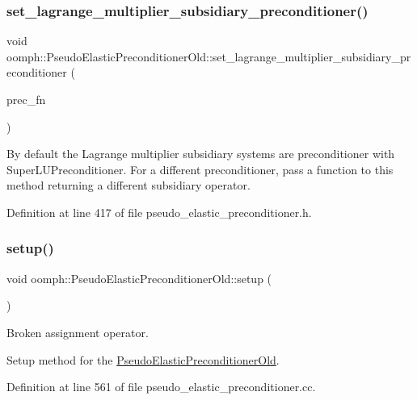 \subsubsection{\texorpdfstring{set\+\_\+lagrange\+\_\+multiplier\+\_\+subsidiary\+\_\+preconditioner()}{set\_lagrange\_multiplier\_subsidiary\_preconditioner()}}
{\footnotesize\ttfamily void oomph\+::\+Pseudo\+Elastic\+Preconditioner\+Old\+::set\+\_\+lagrange\+\_\+multiplier\+\_\+subsidiary\+\_\+preconditioner (\begin{DoxyParamCaption}\item[{\hyperlink{classoomph_1_1PseudoElasticPreconditionerOld_a8ee80a4a55139190a6e2a16fa175e75f}{Subsidiary\+Preconditioner\+Fct\+Pt}}]{prec\+\_\+fn }\end{DoxyParamCaption})\hspace{0.3cm}{\ttfamily [inline]}}



By default the Lagrange multiplier subsidiary systems are preconditioner with Super\+L\+U\+Preconditioner. For a different preconditioner, pass a function to this method returning a different subsidiary operator. 



Definition at line 417 of file pseudo\+\_\+elastic\+\_\+preconditioner.\+h.

\mbox{\label{classoomph_1_1PseudoElasticPreconditionerOld_a25d542a5b98d70be1aa1dd6000402978}} 
\subsubsection{\texorpdfstring{setup()}{setup()}}
{\footnotesize\ttfamily void oomph\+::\+Pseudo\+Elastic\+Preconditioner\+Old\+::setup (\begin{DoxyParamCaption}{ }\end{DoxyParamCaption})}



Broken assignment operator. 

Setup method for the \hyperlink{classoomph_1_1PseudoElasticPreconditionerOld}{Pseudo\+Elastic\+Preconditioner\+Old}. 

Definition at line 561 of file pseudo\+\_\+elastic\+\_\+preconditioner.\+cc.




